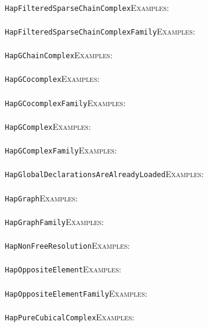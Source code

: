\documentclass[a4paper,11pt]{report}
\begin{document}
{{ \\
 \texttt{HapFilteredSparseChainComplex}{\nobreakspace}{\nobreakspace}{\nobreakspace}{\nobreakspace}\textsc{Examples:} \\
 \\
 \texttt{HapFilteredSparseChainComplexFamily}{\nobreakspace}{\nobreakspace}{\nobreakspace}{\nobreakspace}\textsc{Examples:} \\
 \\
 \texttt{HapGChainComplex}{\nobreakspace}{\nobreakspace}{\nobreakspace}{\nobreakspace}\textsc{Examples:} \\
 \\
 \texttt{HapGCocomplex}{\nobreakspace}{\nobreakspace}{\nobreakspace}{\nobreakspace}\textsc{Examples:} \\
 \\
 \texttt{HapGCocomplexFamily}{\nobreakspace}{\nobreakspace}{\nobreakspace}{\nobreakspace}\textsc{Examples:} \\
 \\
 \texttt{HapGComplex}{\nobreakspace}{\nobreakspace}{\nobreakspace}{\nobreakspace}\textsc{Examples:} \\
 \\
 \texttt{HapGComplexFamily}{\nobreakspace}{\nobreakspace}{\nobreakspace}{\nobreakspace}\textsc{Examples:} \\
 \\
 \texttt{HapGlobalDeclarationsAreAlreadyLoaded}{\nobreakspace}{\nobreakspace}{\nobreakspace}{\nobreakspace}\textsc{Examples:} \\
 \\
 \texttt{HapGraph}{\nobreakspace}{\nobreakspace}{\nobreakspace}{\nobreakspace}\textsc{Examples:} \\
 \\
 \texttt{HapGraphFamily}{\nobreakspace}{\nobreakspace}{\nobreakspace}{\nobreakspace}\textsc{Examples:} \\
 \\
 \texttt{HapNonFreeResolution}{\nobreakspace}{\nobreakspace}{\nobreakspace}{\nobreakspace}\textsc{Examples:} \\
 \\
 \texttt{HapOppositeElement}{\nobreakspace}{\nobreakspace}{\nobreakspace}{\nobreakspace}\textsc{Examples:} \\
 \\
 \texttt{HapOppositeElementFamily}{\nobreakspace}{\nobreakspace}{\nobreakspace}{\nobreakspace}\textsc{Examples:} \\
 \\
 \texttt{HapPureCubicalComplex}{\nobreakspace}{\nobreakspace}{\nobreakspace}{\nobreakspace}\textsc{Examples:} \\
}}
\end{document}
